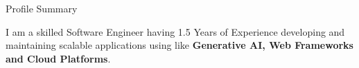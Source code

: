\documentclass{resume} %
\begin{document}

\begin{rSection}{Profile Summary}

{\normalfont I am a skilled Software Engineer having 1.5 Years of Experience developing and maintaining scalable applications using like \textbf{Generative AI, Web Frameworks and Cloud Platforms}.}

\end{rSection}


\end{document}
